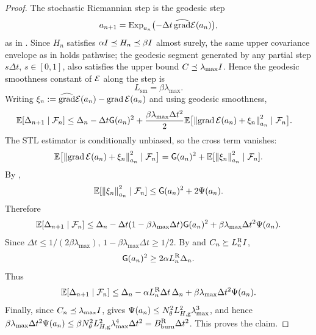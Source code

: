 \begin{proof}
The stochastic Riemannian step is the geodesic step
\[
    a_{n+1}
    =
    \operatorname{Exp}_{a_n}\bigl(-\Delta t\,\widehat{\operatorname{grad}}\mathcal{E}(a_n)\bigr),
\]
as in . Since $H_n$ satisfies
$\alpha I\preceq H_n\preceq\beta I$ almost surely, the same upper covariance envelope as
in  holds pathwise; the geodesic segment generated by any partial step
$s\Delta t$, $s\in[0,1]$, also satisfies the upper bound $C\preceq\lambda_{\max}I$. Hence
the geodesic smoothness constant of $\mathcal{E}$ along the step is
\[
    L_{\mathrm{sm}}=\beta\lambda_{\max}.
\]
Writing $\xi_n:=\widehat{\operatorname{grad}}\mathcal{E}(a_n)-\operatorname{grad}\mathcal{E}(a_n)$ and using geodesic smoothness,
\[
\begin{aligned}
    \mathbb{E}[\Delta_{n+1}\mid\mathcal{F}_n]
    &\leq
    \Delta_n
    -\Delta t\mathsf{G}(a_n)^2
    +
    \frac{\beta\lambda_{\max}\Delta t^2}{2}
    \mathbb{E}\bigl[
        \left\lVert \operatorname{grad}\mathcal{E}(a_n)+\xi_n\right\rVert_{a_n}^2
        \mid\mathcal{F}_n
    \bigr].
\end{aligned}
\]
The STL estimator is conditionally unbiased, so the cross term vanishes:
\[
    \mathbb{E}\bigl[
        \left\lVert \operatorname{grad}\mathcal{E}(a_n)+\xi_n\right\rVert_{a_n}^2
        \mid\mathcal{F}_n
    \bigr]
    =
    \mathsf{G}(a_n)^2+\mathbb{E}[\left\lVert \xi_n\right\rVert_{a_n}^2\mid\mathcal{F}_n].
\]
By ,
\[
    \mathbb{E}[\left\lVert \xi_n\right\rVert_{a_n}^2\mid\mathcal{F}_n]
    \leq
    \mathsf{G}(a_n)^2+2\Psi(a_n).
\]
Therefore
\[
    \mathbb{E}[\Delta_{n+1}\mid\mathcal{F}_n]
    \leq
    \Delta_n
    -
    \Delta t(1-\beta\lambda_{\max}\Delta t)\mathsf{G}(a_n)^2
    +
    \beta\lambda_{\max}\Delta t^2\Psi(a_n).
\]
Since $\Delta t\leq1/(2\beta\lambda_{\max})$,
$1-\beta\lambda_{\max}\Delta t\geq1/2$. By
 and $C_n\succeq L_n^{\mathrm{R}}I$,
\[
    \mathsf{G}(a_n)^2
    \geq
    2\alpha L_n^{\mathrm{R}}\Delta_n .
\]
Thus
\[
    \mathbb{E}[\Delta_{n+1}\mid\mathcal{F}_n]
    \leq
    \Delta_n-\alpha L_n^{\mathrm{R}}\Delta t\,\Delta_n
    +
    \beta\lambda_{\max}\Delta t^2\Psi(a_n).
\]
Finally, since $C_n\preceq\lambda_{\max}I$,  gives
$\Psi(a_n)\leq N_\theta^2L_{H,\mathrm g}^2\lambda_{\max}^3$, and hence
$\beta\lambda_{\max}\Delta t^2\Psi(a_n)\leq\beta N_\theta^2L_{H,\mathrm g}^2\lambda_{\max}^4\Delta t^2=B_{\mathrm{burn}}^{\mathrm{R}}\Delta t^2$.
This proves the claim.
\end{proof}

